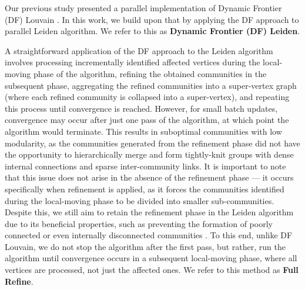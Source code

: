 Our previous study presented a parallel implementation of Dynamic Frontier (DF) Louvain \cite{sahu2024dflouvain}. In this work, we build upon that by applying the DF approach to parallel Leiden algorithm. We refer to this as \textbf{Dynamic Frontier (DF) Leiden}.

A straightforward application of the DF approach to the Leiden algorithm involves processing incrementally identified affected vertices during the local-moving phase of the algorithm, refining the obtained communities in the subsequent phase, aggregating the refined communities into a super-vertex graph (where each refined community is collapsed into a super-vertex), and repeating this process until convergence is reached. However, for small batch updates, convergence may occur after just one pass of the algorithm, at which point the algorithm would terminate. This results in suboptimal communities with low modularity, as the communities generated from the refinement phase did not have the opportunity to hierarchically merge and form tightly-knit groups with dense internal connections and sparse inter-community links. It is important to note that this issue does not arise in the absence of the refinement phase --- it occurs specifically when refinement is applied, as it forces the communities identified during the local-moving phase to be divided into smaller sub-communities. Despite this, we still aim to retain the refinement phase in the Leiden algorithm due to its beneficial properties, such as preventing the formation of poorly connected or even internally disconnected communities \cite{com-traag19}. To this end, unlike DF Louvain, we do not stop the algorithm after the first pass, but rather, run the algorithm until convergence occurs in a subsequent local-moving phase, where all vertices are processed, not just the affected ones. We refer to this method as \textbf{Full Refine}.

